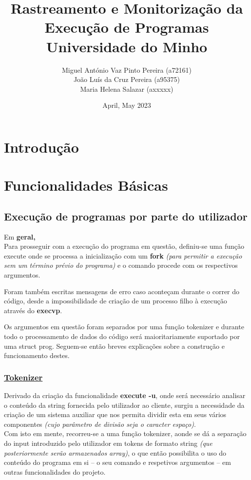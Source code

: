 \documentclass{report}
\title{Rastreamento e Monitorização da Execução de Programas\\
\Large Universidade do Minho}
\author{Miguel António Vaz Pinto Pereira (a72161)\\João Luís da Cruz Pereira (a95375)\\ Maria Helena Salazar (axxxxx)}
\date{April, May 2023}
\begin{document}

\maketitle
\section{Introdução}
\lipsum[5]
\newpage

\section{Funcionalidades Básicas}
\subsection{Execução de programas por parte do utilizador}

Em \textbf{geral,}\\

Para prosseguir com a execução do programa em questão, definiu-se uma função execute onde se processa a inicialização com um \textbf{fork} \textit{(para permitir a execução sem um término prévio do programa)} e o comando procede com os respectivos argumentos.\par
Foram também escritas mensagens de erro caso aconteçam durante o correr do código, desde a impossibilidade de criação de um processo filho à execução através do \textbf{execvp}.\par
Os argumentos em questão foram separados por uma função tokenizer e durante todo o processamento de dados do código será maioritariamente suportado por uma struct prog. Seguem-se então breves explicações sobre a construção e funcionamento destes.

\subsubsection{\underline{Tokenizer}}

Derivado da criação da funcionalidade \textbf{execute -u}, onde será necessário analisar o conteúdo da string fornecida pelo utilizador ao cliente, surgiu a necessidade da criação de um sistema auxiliar que nos permita dividir esta em seus vários componentes \textit{(cujo parâmetro de divisão seja o caracter espaço)}.\\
Com isto em mente, recorreu-se a uma função tokenizer, aonde se dá a separação do input introduzido pelo utilizador em tokens de formato string \textit{(que posteriormente serão armazenados array)}, o que então possibilita o uso do conteúdo do programa em si – o seu comando e respetivos argumentos – em outras funcionalidades do projeto.
\end{document}
